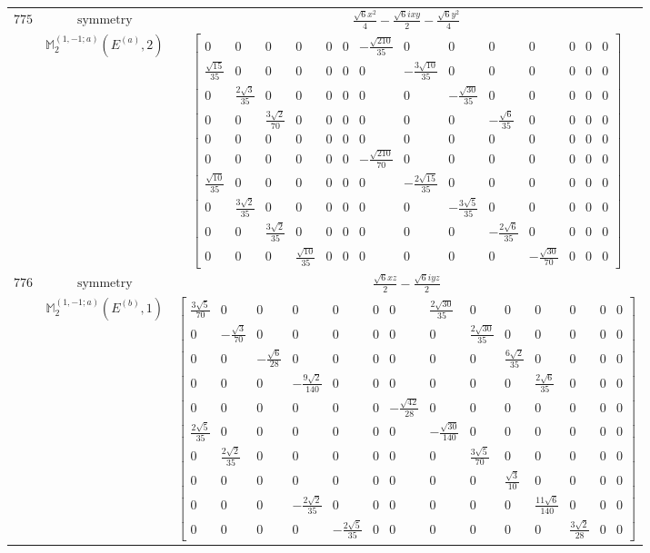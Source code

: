 \documentclass[fleqn,8pt,landscape]{jsarticle}
\begin{document}
\begin{longtable}{ccc}
$ 775 $ & $ \text{symmetry} $ & $ \frac{\sqrt{6} x^{2}}{4} - \frac{\sqrt{6} i x y}{2} - \frac{\sqrt{6} y^{2}}{4} $ \\
$  $ & $ \mathbb{M}_{2}^{(1,-1;a)}(E^{(a)},2) $ & $ \begin{bmatrix} 0 & 0 & 0 & 0 & 0 & 0 & - \frac{\sqrt{210}}{35} & 0 & 0 & 0 & 0 & 0 & 0 & 0 \\ \frac{\sqrt{15}}{35} & 0 & 0 & 0 & 0 & 0 & 0 & - \frac{3 \sqrt{10}}{35} & 0 & 0 & 0 & 0 & 0 & 0 \\ 0 & \frac{2 \sqrt{3}}{35} & 0 & 0 & 0 & 0 & 0 & 0 & - \frac{\sqrt{30}}{35} & 0 & 0 & 0 & 0 & 0 \\ 0 & 0 & \frac{3 \sqrt{2}}{70} & 0 & 0 & 0 & 0 & 0 & 0 & - \frac{\sqrt{6}}{35} & 0 & 0 & 0 & 0 \\ 0 & 0 & 0 & 0 & 0 & 0 & 0 & 0 & 0 & 0 & 0 & 0 & 0 & 0 \\ 0 & 0 & 0 & 0 & 0 & 0 & - \frac{\sqrt{210}}{70} & 0 & 0 & 0 & 0 & 0 & 0 & 0 \\ \frac{\sqrt{10}}{35} & 0 & 0 & 0 & 0 & 0 & 0 & - \frac{2 \sqrt{15}}{35} & 0 & 0 & 0 & 0 & 0 & 0 \\ 0 & \frac{3 \sqrt{2}}{35} & 0 & 0 & 0 & 0 & 0 & 0 & - \frac{3 \sqrt{5}}{35} & 0 & 0 & 0 & 0 & 0 \\ 0 & 0 & \frac{3 \sqrt{2}}{35} & 0 & 0 & 0 & 0 & 0 & 0 & - \frac{2 \sqrt{6}}{35} & 0 & 0 & 0 & 0 \\ 0 & 0 & 0 & \frac{\sqrt{10}}{35} & 0 & 0 & 0 & 0 & 0 & 0 & - \frac{\sqrt{30}}{70} & 0 & 0 & 0 \end{bmatrix} $ \\ \hline
$ 776 $ & $ \text{symmetry} $ & $ \frac{\sqrt{6} x z}{2} - \frac{\sqrt{6} i y z}{2} $ \\
$  $ & $ \mathbb{M}_{2}^{(1,-1;a)}(E^{(b)},1) $ & $ \begin{bmatrix} \frac{3 \sqrt{5}}{70} & 0 & 0 & 0 & 0 & 0 & 0 & \frac{2 \sqrt{30}}{35} & 0 & 0 & 0 & 0 & 0 & 0 \\ 0 & - \frac{\sqrt{3}}{70} & 0 & 0 & 0 & 0 & 0 & 0 & \frac{2 \sqrt{30}}{35} & 0 & 0 & 0 & 0 & 0 \\ 0 & 0 & - \frac{\sqrt{6}}{28} & 0 & 0 & 0 & 0 & 0 & 0 & \frac{6 \sqrt{2}}{35} & 0 & 0 & 0 & 0 \\ 0 & 0 & 0 & - \frac{9 \sqrt{2}}{140} & 0 & 0 & 0 & 0 & 0 & 0 & \frac{2 \sqrt{6}}{35} & 0 & 0 & 0 \\ 0 & 0 & 0 & 0 & 0 & 0 & - \frac{\sqrt{42}}{28} & 0 & 0 & 0 & 0 & 0 & 0 & 0 \\ \frac{2 \sqrt{5}}{35} & 0 & 0 & 0 & 0 & 0 & 0 & - \frac{\sqrt{30}}{140} & 0 & 0 & 0 & 0 & 0 & 0 \\ 0 & \frac{2 \sqrt{2}}{35} & 0 & 0 & 0 & 0 & 0 & 0 & \frac{3 \sqrt{5}}{70} & 0 & 0 & 0 & 0 & 0 \\ 0 & 0 & 0 & 0 & 0 & 0 & 0 & 0 & 0 & \frac{\sqrt{3}}{10} & 0 & 0 & 0 & 0 \\ 0 & 0 & 0 & - \frac{2 \sqrt{2}}{35} & 0 & 0 & 0 & 0 & 0 & 0 & \frac{11 \sqrt{6}}{140} & 0 & 0 & 0 \\ 0 & 0 & 0 & 0 & - \frac{2 \sqrt{5}}{35} & 0 & 0 & 0 & 0 & 0 & 0 & \frac{3 \sqrt{2}}{28} & 0 & 0 \end{bmatrix} $ \\ \hline

\end{longtable}
\end{document}
